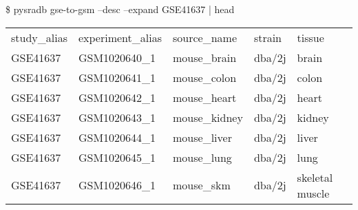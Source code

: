 \documentclass[9pt,a4paper]{extarticle}
\newenvironment{allintypewriter}{\ttfamily}{\par}
\begin{document}
\begin{allintypewriter}
\$ pysradb gse-to-gsm --desc --expand GSE41637 | head\\
\begin{table}[H]
    \begin{tabular}{lllll}
        study_alias & experiment_alias & source_name &  strain & tissue\\
        GSE41637 & GSM1020640_1 &  mouse_brain &  dba/2j & brain\\
        GSE41637 & GSM1020641_1 &  mouse_colon &  dba/2j & colon\\
        GSE41637 & GSM1020642_1 &  mouse_heart &  dba/2j & heart\\
        GSE41637 & GSM1020643_1 &  mouse_kidney & dba/2j & kidney\\
        GSE41637 & GSM1020644_1 &  mouse_liver &  dba/2j & liver\\
        GSE41637 & GSM1020645_1 &  mouse_lung & dba/2j & lung\\
        GSE41637 & GSM1020646_1 &  mouse_skm & dba/2j & skeletal muscle\\
    \end{tabular}
\end{table}
\end{allintypewriter}

\end{document}
